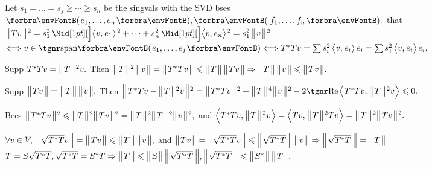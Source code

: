 

Let $s_1=\dots=s_j\geqslant\cdots\geqslant s_n$ be the singvals with the SVD bses $\Par{e_1,\dots,e_n},\Par{\,f_1,\dots,f_n}.$\parSol{}
\NOTICE that $\Dvertsq{Tv}=s_1^2\,\innerAsq{v,\:\!e_1}+\dots+s_n^2\,\innerAsq{v,\:\!e_n}=s_1^2\;\!\Dvertsq{v}$\parSol{}
$\Longleftrightarrow v\in\Span{e_1,\dots,e_j}\Longleftrightarrow T^*Tv=\sum s_i^2\,\Ang{v,\:\!e_i}\,e_i=\sum s_1^2\,\Ang{v,\:\!e_i}\,e_i.$\PfEnd\vspace{4pt}\par\quad
\Or Supp $T^*Tv=\Dvertsq{T}v.$ Then $\Dvertsq{T}\,\Dvert{v}=\Dvert{T^*Tv}\leqslant\Dvert{T}\,\Dvert{Tv}\Rightarrow\Dvert{T}\,\Dvert{v}\leqslant\Dvert{Tv}.$\par\quad
Supp $\Dvert{Tv}=\Dvert{T}\,\Dvert{v}.$ Then $\BigDvertsq{T^*Tv-\Dvertsq{T}v}=\Dvertsq{T^*Tv}+\Dvert{T}{^4}\Dvertsq{v}-2\Real\BigAng{T^*Tv,\:\!\Dvertsq{T}v}\leqslant0.$\par\quad
Becs $\Dvertsq{T^*Tv}\leqslant\Dvertsq{T}\Dvertsq{Tv}=\Dvertsq{T}\Dvertsq{T}\Dvertsq{v},$ and $\BigAng{T^*Tv,\:\!\Dvertsq{T}v}=\BigAng{Tv,\:\!\Dvertsq{T}Tv}=\Dvertsq{T}\Dvertsq{Tv}.$\PfEnd
\SepLine

$\forall v\in V,\:\BigDvert{\sqrt{T^*T}v}=\Dvert{Tv}\leqslant\Dvert{T}\,\Dvert{v},$ and $\Dvert{Tv}=\BigDvert{\sqrt{T^*T}v}\leqslant\BigDvert{\sqrt{T^*T}\;\!}\,\Dvert{v}\Rightarrow\BigDvert{\sqrt{T^*T}\;\!}=\Dvert{T}.$\PfEnd\vspace{2pt}\parSol{}
\Or $T=S\sqrt{T^*T},\sqrt{T^*T}=S^*T\Rightarrow\Dvert{T}\leqslant\Dvert{S}\,\BigDvert{\sqrt{T^*T}\;\!},\BigDvert{\sqrt{T^*T}\;\!}\leqslant\Dvert{S^*}\,\Dvert{T}.$\PfEnd
\SepLine

